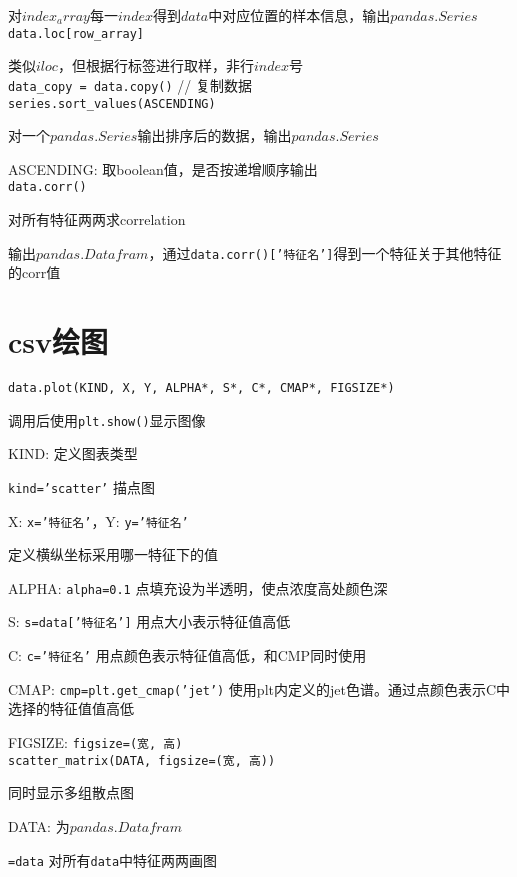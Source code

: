 \documentclass[UTF8]{ctexart}
\begin{document}
  对$index_array$每一$index$得到$data$中对应位置的样本信息，输出$pandas.Series$\\
\texttt{data.loc[row\_array]}

  类似$iloc$，但根据行标签进行取样，非行$index$号\\
\texttt{data\_copy = data.copy()} // 复制数据\\
\texttt{series.sort\_values(ASCENDING)}

  对一个$pandas.Series$输出排序后的数据，输出$pandas.Series$

  ASCENDING: 取boolean值，是否按递增顺序输出\\
\texttt{data.corr()} 
  
  对所有特征两两求correlation

  输出$pandas.Datafram$，通过\texttt{data.corr()['特征名']}得到一个特征关于其他特征的corr值

\section{csv绘图}
\noindent \texttt{data.plot(KIND, X, Y, ALPHA*, S*, C*, CMAP*, FIGSIZE*)}

  调用后使用\texttt{plt.show()}显示图像

  KIND: 定义图表类型
  
  \quad \texttt{kind='scatter'} 描点图

  X: \texttt{x='特征名'}，Y: \texttt{y='特征名'}

  \quad 定义横纵坐标采用哪一特征下的值

  ALPHA: \texttt{alpha=0.1} 点填充设为半透明，使点浓度高处颜色深

  S: \texttt{s=data['特征名']} 用点大小表示特征值高低
  
  C: \texttt{c='特征名'} 用点颜色表示特征值高低，和CMP同时使用

  CMAP: \texttt{cmp=plt.get\_cmap('jet')} 使用plt内定义的jet色谱。通过点颜色表示C中选择的特征值值高低

  FIGSIZE: \texttt{figsize=(宽, 高)}\\
\texttt{scatter\_matrix(DATA, figsize=(宽, 高))}

  同时显示多组散点图

  DATA: 为$pandas.Datafram$
  
  \quad \texttt{=data} 对所有\texttt{data}中特征两两画图
\end{document}
